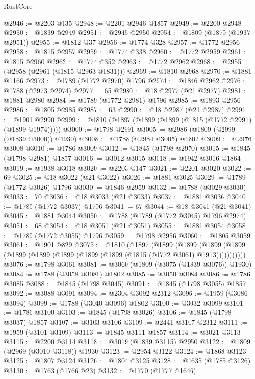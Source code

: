 \begin{lexlean}{RustCore}
\begin{coremodule}
@2946 := @2203 @135
@2948 := @2201 @2946 @1857
@2949 := @2200 @2948
@2950 := @1839 @2949
@2951 := @2945 @2950
@2954 := @1809 (@1879 (@1937 @2951))
@2955 := @1812 @37
@2956 := @1774 @328
@2957 := @1772 @2956
@2958 := @1815 @2957
@2959 := @1774 @338
@2960 := @1772 @2959
@2961 := @1815 @2960
@2962 := @1774 @352
@2963 := @1772 @2962
@2968 := @2955 (@2958 (@2961 (@1815 @2963 @1831)))
@2969 := @1810 @2968
@2970 := @1881 @1166
@2973 := @1789 (@1772 @2970) @1796
@2974 := @1846 @2962
@2976 := @1788 (@2973 @2974)
@2977 := 65
@2980 := @18 @2977 (@21 @2977)
@2981 := @1881 @2980
@2984 := @1789 (@1772 @2981) @1796
@2985 := @1893 @2956
@2986 := @1805 @2985
@2987 := 63
@2990 := @18 @2987 (@21 @2987)
@2991 := @1901 @2990
@2999 := @1810 (@1897 (@1899 (@1899 (@1815 (@1772 @2991) (@1899 @1974)))))
@3000 := @1798 @2991
@3005 := @2986 (@1809 (@2999 (@1839 @3000)) @1930)
@3008 := @1788 (@2984 @3005) @1802
@3009 := @2976 @3008
@3010 := @1786 @3009
@3012 := @1845 (@1798 @2970)
@3015 := @1845 (@1798 @2981) @1857
@3016 := @3012 @3015
@3018 := @1942 @3016 @1864
@3019 := @1938 @3018
@3020 := @2203 @147
@3021 := @2201 @3020
@3022 := 69
@3025 := @18 @3022 (@21 @3022)
@3026 := @1881 @3025
@3029 := @1789 (@1772 @3026) @1796
@3030 := @1846 @2959
@3032 := @1788 (@3029 @3030)
@3033 := 70
@3036 := @18 @3033 (@21 @3033)
@3037 := @1881 @3036
@3040 := @1789 (@1772 @3037) @1796
@3041 := 67
@3044 := @18 @3041 (@21 @3041)
@3045 := @1881 @3044
@3050 := @1788 (@1789 (@1772 @3045) @1796 @2974)
@3051 := 68
@3054 := @18 @3051 (@21 @3051)
@3055 := @1881 @3054
@3058 := @1789 (@1772 @3055) @1796
@3059 := @1798 @2956
@3060 := @1805 @3059
@3061 := @1901 @829
@3075 := @1810
    (@1897
      (@1899
        (@1899
          (@1899 (@1899 (@1899 (@1899 (@1899 (@1899 (@1899 (@1815 (@1772 @3061) @1913)))))))))))
@3076 := @1798 @3061
@3081 := @3060 (@1809 (@3075 (@1839 @3076)) @1930)
@3084 := @1788 (@3058 @3081) @1802
@3085 := @3050 @3084
@3086 := @1786 @3085
@3088 := @1845 (@1798 @3045)
@3091 := @1845 (@1798 @3055) @1857
@3092 := @3088 @3091
@3094 := @2304 @3092 @2312
@3096 := @1959 (@3086 @3094)
@3099 := @1788 (@3040 @3096) @1802
@3100 := @3032 @3099
@3101 := @1786 @3100
@3103 := @1845 (@1798 @3026)
@3106 := @1845 (@1798 @3037) @1857
@3107 := @3103 @3106
@3109 := @2441 @3107 @2312
@3111 := @1959 (@3101 @3109)
@3113 := @1845 @3111 @1857
@3114 := @3021 @3113
@3115 := @2200 @3114
@3118 := @3019 (@1839 @3115) @2950
@3122 := @1809 (@2969 (@3010 @3118)) @1930
@3123 := @2954 @3122
@3124 := @1868 @3123
@3125 := @1807 @3124
@3126 := @1804 @3125
@3128 := @1635 (@1785 @3126)
@3130 := @1763 (@1766 @23)
@3132 := @1770 (@1777 @1646)

\end{coremodule}
\end{lexlean}
